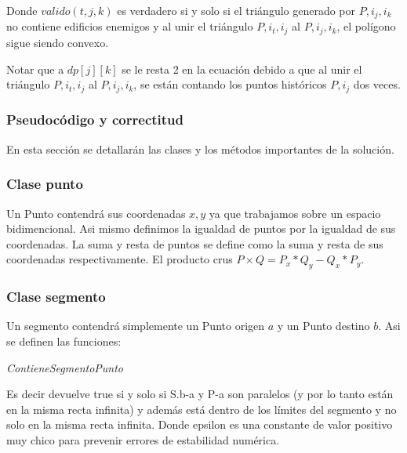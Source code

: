 Donde $valido(t,j,k)$ es verdadero si y solo si el triángulo generado por $P, i_j, i_k$ no contiene edificios enemigos
y al unir el triángulo $P, i_t, i_j$ al $P, i_j, i_k$, el polígono sigue siendo convexo.

Notar que a $dp[j][k]$ se le resta 2 en la ecuación debido a que al unir el triángulo $P, i_t, i_j$ al $P, i_j, i_k$,
se están contando los puntos históricos $P, i_j$ dos veces.

\subsubsection{Pseudocódigo y correctitud}

En esta sección se detallarán las clases y los métodos importantes de la solución.

\subsubsection*{Clase punto}

Un Punto contendrá sus coordenadas $x,y$ ya que trabajamos sobre un espacio bidimencional. Asi mismo definimos
la igualdad de puntos por la igualdad de sus coordenadas. La suma y resta de puntos se define como la suma y resta
de sus coordenadas respectivamente. El producto crus $P \times Q = P_x * Q_y - Q_x * P_y$.

\subsubsection*{Clase segmento}

Un segmento contendrá simplemente un Punto origen $a$ y un Punto destino $b$. Asi se definen las funciones:

\begin{algorithm}[H]
	\caption{\textit{ContieneSegmentoPunto}}
\end{algorithm}

Es decir devuelve true si y solo si S.b-a y P-a son paralelos (y por lo tanto están en la misma recta infinita)
y además está dentro de los límites del segmento y no solo en la misma recta infinita.
Donde epsilon es una constante de valor positivo muy chico para prevenir errores de estabilidad numérica.

